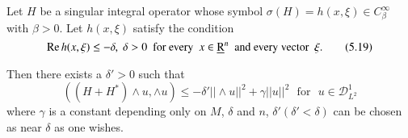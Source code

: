 \begin{proposition}\label{chap3-sec5-prop-2}%
Let $H$ be a singular integral operator whose symbol $\sigma (H) =
h(x, \xi) \in C^\infty_\beta$ with $\beta > 0$. Let $h
(x,\xi) $ satisfy the condition  
\begin{equation}
\operatorname{Re} h (x, \xi ) \leq - \delta, \; \delta > 0 \text{~ for every~ } x
\in \underbar{R}^n \text{~ and every vector~ }
\xi. \tag{5.19}\label{chap3-eq5.19}  
\end{equation}

Then there exists a $\delta' > 0 $ such that 
\begin{equation}
((H + H^* ) \wedge u, \wedge u) \leq - \delta' || \wedge u ||^2 +
  \gamma || u||^2 \text{~ for~ } u \in \mathscr{D}^1_{L^2}
  \tag{5.20} \label{chap3-eq5.20}
\end{equation}
where $\gamma $ is a constant depending only on $M$, $\delta$ and $n$,
$\delta'(\delta' < \delta)$ can be chosen as near $\delta$ as one
wishes.  
\end{proposition}


